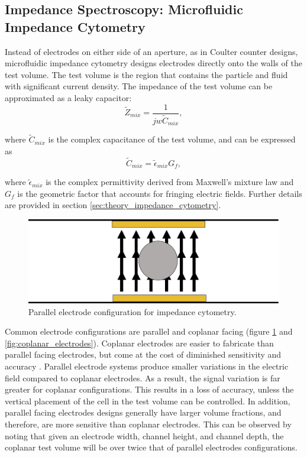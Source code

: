  \subsection*{Impedance Spectroscopy: Microfluidic Impedance Cytometry}
 \par Instead of electrodes on either side of an aperture, as in Coulter counter designs, microfluidic impedance cytometry designs electrodes directly onto the walls of the test volume. The test volume is the region that contains the particle and fluid with significant current density. The impedance of the test volume can be approximated as a leaky capacitor:
 \begin{equation}
       \tilde{Z}_{mix} = \frac{1}{jw\tilde{C}_{mix}},
    \label{eqn:impedance_with_cap}
 \end{equation}
 
 \noindent where $\tilde{C}_{mix}$ is the complex capacitance of the test volume, and can be expressed as
 \begin{equation}
     \tilde{C}_{mix} = \tilde{\epsilon}_{mix}G_f,
 \end{equation}
 
 \noindent where $\tilde{\epsilon}_{mix}$ is the complex permittivity derived from Maxwell's mixture law and $G_f$ is the geometric factor that accounts for fringing electric fields. Further details are provided in section \ref{sec:theory_impedance_cytometry}.
 
 \begin{figure}[ht]
     \centering
     \includegraphics[width=\textwidth]{images/parallel.png}
     \caption{Parallel electrode configuration for impedance cytometry.}
     \label{fig:parallel_electrodes}
 \end{figure}
 
 \par Common electrode configurations are parallel and coplanar facing (figure \ref{fig:parallel_electrodes} and \ref{fig:coplanar_electrodes}). Coplanar electrodes are easier to fabricate than parallel facing electrodes, but come at the cost of diminished sensitivity and accuracy \cite{sun_analytical_2007}. Parallel electrode systems produce smaller variations in the electric field compared to coplanar electrodes. As a result, the signal variation is far greater for coplanar configurations. This results in a loss of accuracy, unless the vertical placement of the cell in the test volume can be controlled. In addition, parallel facing electrodes designs generally have larger volume fractions, and therefore, are more sensitive than coplanar electrodes. This can be observed by noting that given an electrode width, channel height, and channel depth, the coplanar test volume will be over twice that of parallel electrodes configurations.
  
